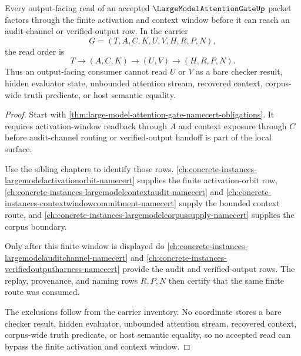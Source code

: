 \begin{theorem}
\label{thm:large-model-attention-gate-finite-window-soundness}
Every output-facing read of an accepted $\LargeModelAttentionGateUp$ packet factors through the finite activation and context window before it can reach an audit-channel or verified-output row. In the carrier
$$
G=(T,A,C,K,U,V,H,R,P,N),
$$
the read order is
$$
T \to (A,C,K) \to (U,V) \to (H,R,P,N).
$$
Thus an output-facing consumer cannot read $U$ or $V$ as a bare checker result, hidden evaluator state, unbounded attention stream, recovered context, corpus-wide truth predicate, or host semantic equality.
\end{theorem}
\begin{proof}
Start with \autoref{thm:large-model-attention-gate-namecert-obligations}. It requires activation-window readback through $A$ and context exposure through $C$ before audit-channel routing or verified-output handoff is part of the local surface.

Use the sibling chapters to identify those rows. \autoref{ch:concrete-instances-largemodelactivationorbit-namecert} supplies the finite activation-orbit row, \autoref{ch:concrete-instances-largemodelcontextaudit-namecert} and \autoref{ch:concrete-instances-contextwindowcommitment-namecert} supply the bounded context route, and \autoref{ch:concrete-instances-largemodelcorpussupply-namecert} supplies the corpus boundary.

Only after this finite window is displayed do \autoref{ch:concrete-instances-largemodelauditchannel-namecert} and \autoref{ch:concrete-instances-verifiedoutputharness-namecert} provide the audit and verified-output rows. The replay, provenance, and naming rows $R,P,N$ then certify that the same finite route was consumed.

The exclusions follow from the carrier inventory. No coordinate stores a bare checker result, hidden evaluator, unbounded attention stream, recovered context, corpus-wide truth predicate, or host semantic equality, so no accepted read can bypass the finite activation and context window.
\end{proof}



